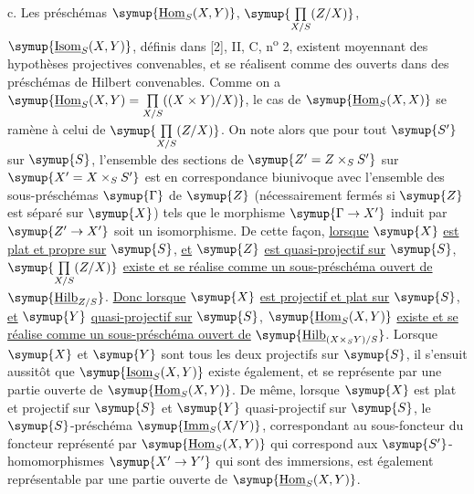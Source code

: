 \medskip
\noindent c. Les préschémas $\symup{\underline{\operatorname{Hom}}_S(X,Y)}$,
$\symup{\prod\limits_{X/S}(Z/X)}$, $\symup{\underline{\operatorname{Isom}}_S(X,Y)}$, définis dans [2], II, C,
n\textsuperscript{o} 2, existent moyennant des hypothèses projectives
convenables, et se réalisent comme des ouverts dans des préschémas de Hilbert
convenables. Comme on a $\symup{\underline{\operatorname{Hom}}_S(X,Y)=\prod\limits_{X/S}((X\times Y)/X)}$, le cas de $\symup{\underline{\operatorname{Hom}}_S(X,X)}$ se ramène à celui de $\symup{\prod\limits_{X/S}(Z/X)}$.
On note alors que pour tout $\symup{S'}$ sur $\symup{S}$, l'ensemble des sections de
$\symup{Z'=Z\times_SS'}$ sur $\symup{X'=X\times_SS'}$ est en correspondance biunivoque avec
l'ensemble des sous-préschémas $\symup{\Gamma}$ de $\symup{Z}$ (nécessairement fermés si $\symup{Z}$
est séparé sur $\symup{X}$) tels que le morphisme $\symup{\Gamma\to X'}$ induit par
$\symup{Z'\to X'}$ soit un isomorphisme. De cette façon,
\uline{lorsque} $\symup{X}$ \uline{est plat et propre sur} $\symup{S}$, \uline{et} $\symup{Z}$ \uline{est quasi-projectif sur} $\symup{S}$,
$\symup{\prod\limits_{X/S}(Z/X)}$ \uline{existe et se réalise comme un sous-préschéma ouvert de}
$\symup{\underline{\operatorname{Hilb}}_{Z/S}}$. \uline{Donc lorsque} $\symup{X}$ \uline{est projectif et plat sur} $\symup{S}$, \uline{et}
$\symup{Y}$ \uline{quasi-projectif sur} $\symup{S}$, $\symup{\underline{\operatorname{Hom}}_S(X,Y)}$ \uline{existe et se réalise
comme un sous-préschéma ouvert de}
$\symup{\underline{\operatorname{Hilb}}_{(X\times_SY)/S}}$. Lorsque $\symup{X}$ et $\symup{Y}$ sont tous les deux
projectifs sur $\symup{S}$, il s'ensuit aussitôt que $\symup{\underline{\operatorname{Isom}}_S(X,Y)}$
existe également, et se représente par une partie ouverte de
$\symup{\underline{\operatorname{Hom}}_S(X,Y)}$. De même, lorsque $\symup{X}$ est plat et projectif sur $\symup{S}$
et $\symup{Y}$ quasi-projectif sur $\symup{S}$, le $\symup{S}$-préschéma
$\symup{\underline{\operatorname{Imm}}_S(X/Y)}$, correspondant au sous-foncteur du foncteur
représenté par $\symup{\underline{\operatorname{Hom}}_S(X,Y)}$ qui correspond aux
$\symup{S'}$-homomorphismes $\symup{X'\to Y'}$ qui sont des immersions, est
également représentable par une partie ouverte de
$\symup{\underline{\operatorname{Hom}}_S(X,Y)}$.

